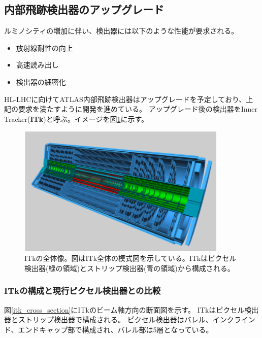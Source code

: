 \subsection{内部飛跡検出器のアップグレード}
ルミノシティの増加に伴い、検出器には以下のような性能が要求される。
\begin{itemize}
  \item 放射線耐性の向上
  \item 高速読み出し
  \item 検出器の細密化
\end{itemize}

HL-LHCに向けてATLAS内部飛跡検出器はアップグレードを予定しており、上記の要求を満たすように開発を進めている。
アップグレード後の検出器をInner Tracker(\textbf{ITk})と呼ぶ。イメージを図\ref{itk_image}に示す。

\begin{figure}[bpt]\centering
\includegraphics[width=10cm]{itk_image}
\caption[ITkの全体像]{ITkの全体像\cite{1-3}。図はITk全体の模式図を示している。ITkはピクセル検出器(緑の領域)とストリップ検出器(青の領域)から構成される。}
\label{itk_image}
\end{figure}

\subsubsection{ITkの構成と現行ピクセル検出器との比較}
図\ref{itk_cross_section}にITkのビーム軸方向の断面図を示す。
ITkはピクセル検出器とストリップ検出器で構成される。
ピクセル検出器はバレル、インクラインド、エンドキャップ部で構成され、バレル部は5層となっている。

